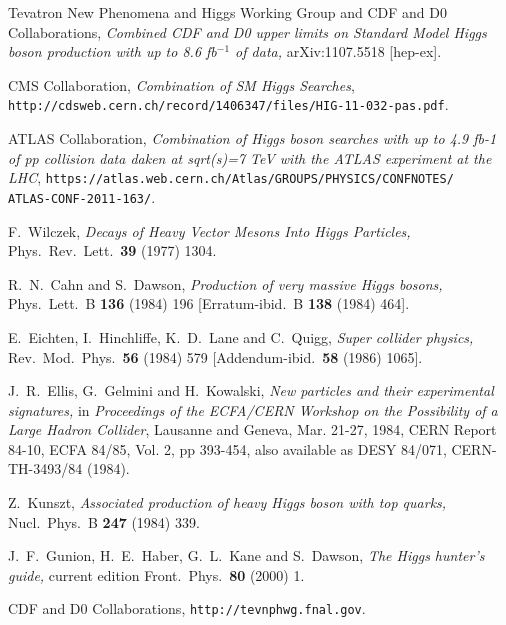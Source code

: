 \documentclass[12pt]{article}
\numberwithin{equation}{section}
\begin{document}
\begin{thebibliography}{99}
Tevatron New Phenomena and Higgs Working Group and CDF and D0 Collaborations,
{\it Combined CDF and D0 upper limits on Standard Model Higgs boson production with up to 8.6 fb$^{-1}$ of data,}
  arXiv:1107.5518 [hep-ex].

CMS Collaboration, {\it Combination of SM Higgs Searches}, \\
{\tt http://cdsweb.cern.ch/record/1406347/files/HIG-11-032-pas.pdf}.

ATLAS Collaboration, {\it Combination of Higgs boson searches with 
up to 4.9 fb-1 of pp collision data daken at sqrt(s)=7 TeV with the ATLAS experiment at the LHC},
{\tt https://atlas.web.cern.ch/Atlas/GROUPS/PHYSICS/CONFNOTES/} \\ {\tt ATLAS-CONF-2011-163/}.

F.~Wilczek,
{\it Decays of Heavy Vector Mesons Into Higgs Particles,}
  Phys.\ Rev.\ Lett.\  {\bf 39} (1977) 1304.
  
R.~N.~Cahn and S.~Dawson,
{\it Production of very massive Higgs bosons,}
  Phys.\ Lett.\  B {\bf 136} (1984) 196
  [Erratum-ibid.\  B {\bf 138} (1984) 464].

E.~Eichten, I.~Hinchliffe, K.~D.~Lane and C.~Quigg,
{\it Super collider physics,}
  Rev.\ Mod.\ Phys.\  {\bf 56} (1984) 579
  [Addendum-ibid.\  {\bf 58} (1986) 1065].

J.~R.~Ellis, G.~Gelmini and H.~Kowalski,
{\it New particles and their experimental signatures,} in {\it Proceedings of
the ECFA/CERN Workshop on the Possibility of a Large Hadron Collider}, Lausanne and Geneva, Mar. 21-27, 1984,
CERN Report 84-10, ECFA 84/85, Vol. 2, pp 393-454,
also available as DESY 84/071, CERN-TH-3493/84 (1984).
  
Z.~Kunszt,
{\it Associated production of heavy Higgs boson with top quarks,}
  Nucl.\ Phys.\  B {\bf 247} (1984) 339.

J.~F.~Gunion, H.~E.~Haber, G.~L.~Kane and S.~Dawson,
{\it The Higgs hunter's guide,} current edition
  Front.\ Phys.\  {\bf 80} (2000) 1.

CDF and D0 Collaborations, {\tt http://tevnphwg.fnal.gov}.


\end{thebibliography}
\end{document}
